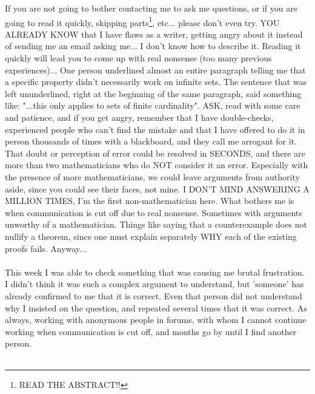 	\noindent
	If you are not going to bother contacting me to ask me questions, or if you are going to read it quickly, skipping parts\footnote{READ THE ABSTRACT!!}, etc... please don't even try. YOU ALREADY KNOW that I have flaws as a writer, getting angry about it instead of sending me an email asking me... I don't know how to describe it. Reading it quickly will lead you to come up with real nonsense (too many previous experiences)... One person underlined almost an entire paragraph telling me that a specific property didn't necessarily work on infinite sets. The sentence that was left ununderlined, right at the beginning of the same paragraph, said something like: "...this only applies to sets of finite cardinality". ASK, read with some care and patience, and if you get angry, remember that I have double-checks, experienced people who can't find the mistake and that I have offered to do it in person thousands of times with a blackboard, and they call me arrogant for it. That doubt or perception of error could be resolved in SECONDS, and there are more than two mathematicians who do NOT consider it an error. Especially with the presence of more mathematicians, we could leave arguments from authority aside, since you could see their faces, not mine. I DON'T MIND ANSWERING A MILLION TIMES, I'm the first non-mathematician here. What bothers me is when communication is cut off due to real nonsense. Sometimes with arguments unworthy of a mathematician. Things like saying that a counterexample does not nullify a theorem, since one must explain separately WHY each of the existing proofs fails. Anyway...\\\\
	
	\noindent
	This week I was able to check something that was causing me brutal frustration. I didn't think it was such a complex argument to understand, but 'someone' has already confirmed to me that it is correct. Even that person did not understand why I insisted on the question, and repeated several times that it was correct. As always, working with anonymous people in forums, with whom I cannot continue working when communication is cut off, and months go by until I find another person.\\\\



